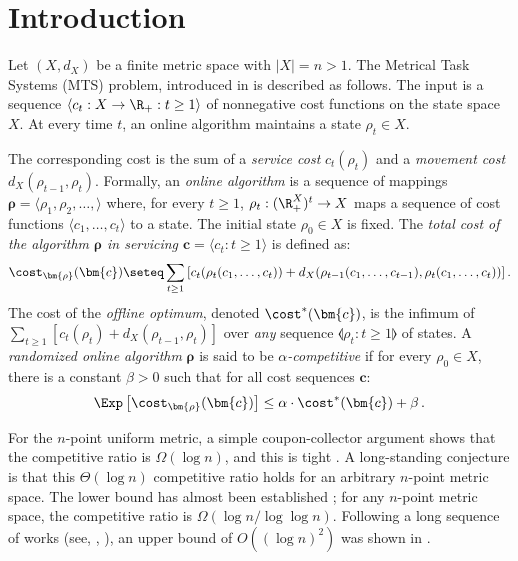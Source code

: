 
%
%
%



\section{Introduction}

Let $(X,d_X)$ be a finite metric space with $|X|=n > 1$. The Metrical Task
Systems (MTS) problem, introduced in \cite{BLS92} is described as follows.
The input is a sequence $\langle c_t : X \rightarrow \R_+ : t \geq 1\rangle$ of
nonnegative cost functions on the state space $X$.
At every time $t$, an online algorithm maintains
a state $\rho_t \in X$.

The corresponding cost is the sum of a \emph{service cost} $c_t(\rho_t)$ and a
\emph{movement cost} $d_X(\rho_{t-1}, \rho_t)$.
Formally, an \emph{online algorithm} is a sequence of mappings
$\bm{\rho} = \langle \rho_1, \rho_2, \ldots, \rangle$
where, for every $t \geq 1$,
$\rho_t : (\R_+^X)^t \to X$ maps a sequence of cost functions $\langle c_1, \ldots, c_t\rangle$
to a state. The initial state $\rho_0 \in X$ is fixed. The \emph{total cost of the algorithm $\bm{\rho}$ in servicing $\bm{c} = \langle c_t : t \geq 1\rangle$} is defined as:
\[
\cost_{\bm{\rho}}(\bm{c}) \seteq \sum_{t \geq 1} \left[c_t\!\left(\rho_t(c_1,\ldots, c_t)\right) + d_X\!\left(\rho_{t-1}(c_1,\ldots, c_{t-1}), \rho_t(c_1,\ldots, c_t)\right)\right].
\]
The cost of the \emph{offline optimum}, denoted $\cost^*(\bm{c})$, is the infimum of
$\sum_{t \geq 1} [c_t(\rho_t)+d_X(\rho_{t-1},\rho_t)]$ over \emph{any} sequence
$\llangle \rho_t : t \geq 1\rrangle$ of states.
A \emph{randomized online algorithm} $\bm{\rho}$  is said to be \emph{$\alpha$-competitive}
if for every $\rho_0 \in X$, there is a constant $\beta > 0$ such that for all
cost sequences $\bm{c}$:
\[
\Exp\left[\cost_{\bm{\rho}}(\bm{c})\right] \leq \alpha \cdot \cost^*(\bm{c}) + \beta\,.
\]

For the $n$-point uniform metric,
a simple coupon-collector argument shows that the competitive ratio is $\Omega(\log n)$, and this is tight \cite{BLS92}. A long-standing conjecture is that this $\Theta(\log n)$ competitive ratio holds for an arbitrary $n$-point metric space.
The lower bound has almost been established \cite{BBM06,BLMN05};
for any $n$-point metric space, the competitive ratio is $\Omega(\log n / \log \log n)$.
Following a long sequence of works (see, \eg, \cite{Sei99,BKRS00,BBBT97,Bar96,FM03,FRT04}),
an upper bound of $O((\log n)^2)$ was shown in \cite{BCLL19}.

